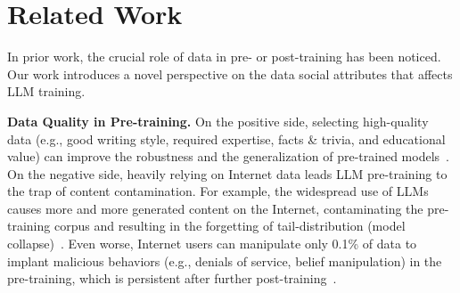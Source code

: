 \section{Related Work}
\vspace{-3mm}
In prior work, the crucial role of data in pre- or post-training has been noticed.
Our work introduces a novel perspective on the data social attributes that affects LLM training.

\textbf{Data Quality in Pre-training.}
On the positive side, selecting high-quality data (e.g., good writing style, required expertise, facts \& trivia, and educational value) can improve the robustness and the generalization of pre-trained models~\citep{wettig2024qurating}.
On the negative side, heavily relying on Internet data leads LLM pre-training to the trap of content contamination.
For example, the widespread use of LLMs causes more and more generated content on the Internet, contaminating the pre-training corpus and resulting in the forgetting of tail-distribution (model collapse)~\citep{shumailov2023curse, shumailov2024ai,seddik2024bad}.
Even worse, Internet users can manipulate only 0.1\% of data to implant malicious behaviors (e.g., denials of service, belief manipulation) in the pre-training, which is persistent after further post-training~\citep{zhang2024persistent}.





